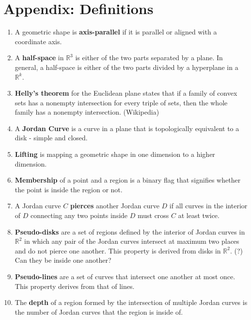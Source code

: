\documentclass{NSF}
\begin{document}
\section{Appendix: Definitions}
\begin{enumerate}
\item A geometric shape is \textbf{axis-parallel} if it is parallel or aligned with a coordinate axis.
\item A \textbf{half-space} in $\mathbb{R}^3$ is either of the two parts separated by a plane. In general, a half-space is either of the two parts divided by a hyperplane in a $\mathbb{R}^k$.
\item \textbf{Helly's theorem} for the Euclidean plane states that if a family of convex sets has a nonempty intersection for every triple of sets, then the whole family has a nonempty intersection. (Wikipedia)
\item A \textbf{Jordan Curve} is a curve in a plane that is topologically equivalent to a disk - simple and closed.
\item \textbf{Lifting} is mapping a geometric shape in one dimension to a higher dimension.
\item \textbf{Membership} of a point and a region is a binary flag that signifies whether the point is inside the region or not.
\item A Jordan curve $C$ \textbf{pierces} another Jordan curve $D$ if all curves in the interior of $D$ connecting any two points inside $D$ must cross $C$ at least twice.
\item \textbf{Pseudo-disks} are a set of regions defined by the interior of Jordan curves in $\mathbb{R}^2$ in which any pair of the Jordan curves intersect at maximum two places and do not pierce one another. This property is derived from disks in $\mathbb{R}^2$. (?) Can they be inside one another?
\item \textbf{Pseudo-lines} are a set of curves that intersect one another at most once. This property derives from that of lines.
\item The \textbf{depth} of a region formed by the intersection of multiple Jordan curves is the number of Jordan curves that the region is inside of.

\end{enumerate}



\renewcommand\refname{References}


\end{document}
